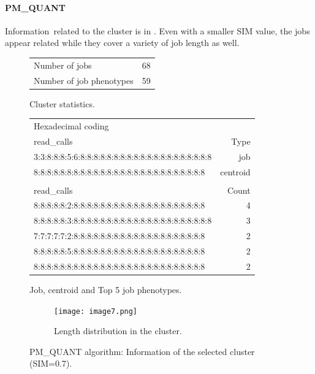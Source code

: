 \documentclass{jhps}
\begin{document}
\FloatBarrier
\paragraph{PM\_QUANT}
Information\ related to the cluster is in .
Even with a smaller SIM value, the jobs appear related while they cover a variety of job length as well.

\begin{figure}
	\begin{subtable}{\textwidth}
		\centering
		\begin{tabular}{ll}
			Number of jobs      & 68  \\
			Number of job phenotypes & 59  \\
		\end{tabular}
		\caption{Cluster statistics.}
		\label{cluster:use_case:pm_quant:stats}
	\end{subtable}
	\medskip
	\begin{subtable}{\textwidth}
		\centering
		\begin{tiny}
			\begin{tabular}{l|r}
				\rowcolor{tblhead}
				Hexadecimal coding & \\
				\rowcolor{tblhead}
				read\_calls                                           & Type     \\
				\hline
				3:3:8:8:8:5:6:8:8:8:8:8:8:8:8:8:8:8:8:8:8:8:8:8:8:8:8 & job      \\
				8:8:8:8:8:8:8:8:8:8:8:8:8:8:8:8:8:8:8:8:8:8:8:8:8:8   & centroid \\
				\multicolumn{2}{l}{}\\
				\rowcolor{tblhead}
				read\_calls                                           & Count    \\
				\hline
				8:8:8:8:8:2:8:8:8:8:8:8:8:8:8:8:8:8:8:8:8:8:8:8:8:8   & 4        \\
				8:8:8:8:8:3:8:8:8:8:8:8:8:8:8:8:8:8:8:8:8:8:8:8:8:8:8 & 3        \\
				7:7:7:7:7:2:8:8:8:8:8:8:8:8:8:8:8:8:8:8:8:8:8:8:8:8   & 2        \\
				8:8:8:8:8:5:8:8:8:8:8:8:8:8:8:8:8:8:8:8:8:8:8:8:8:8   & 2        \\
				8:8:8:8:8:8:8:8:8:8:8:8:8:8:8:8:8:8:8:8:8:8:8:8:8:8   & 2        \\
			\end{tabular}
		\end{tiny}
		\caption{Job, centroid and Top 5 job phenotypes.}
		\label{cluster:use_case:pm_quant:top_jobs}
	\end{subtable}
	\medskip
	\begin{subfigure}{\textwidth}
		\centering
		\texttt{[image: image7.png]}
		\caption{Length distribution in the cluster.}
		\label{cluster:use_case:pm_quant:length}
	\end{subfigure}
	\caption{PM\_QUANT algorithm: Information of the selected cluster (SIM=0.7).}
	\label{cluster:use_case:pm_quant}
\end{figure}
\end{document}
